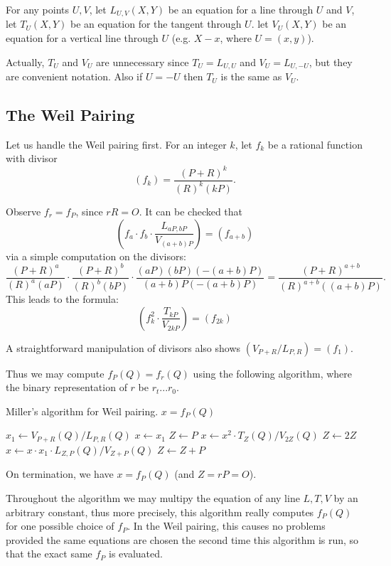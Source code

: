 For any points $U, V$,
let $L_{U,V}(X,Y)$ be an equation for a line through $U$ and $V$,
let $T_{U}(X,Y)$ be an equation for the tangent through $U$.
let
$V_{U}(X,Y)$ be an equation for a vertical line through $U$ (e.g.
$X - x$, where $U = (x, y)$).

Actually, $T_U$ and $V_U$ are unnecessary since
$T_U = L_{U,U}$ and $V_U = L_{U,-U}$, but they are convenient notation.
Also if $U = -U$ then $T_U$ is the same as $V_U$.

\subsection {The Weil Pairing}

Let us handle the Weil pairing first. For an integer $k$, let
$f_k$ be a rational function with divisor
\[
(f_k) = \frac{(P+R)^k}{(R)^k(kP)} .
\]

Observe $f_r = f_P$, since $rR = O$.
It can be checked that
\[
\left(
f_a \cdot f_b \cdot \frac{L_{aP,bP}}{V_{(a+b)P}}
\right) = (f_{a+b})
\]
via a simple computation on the divisors:
\[
\frac{(P+R)^a}{(R)^a(aP)}
\cdot
\frac{(P+R)^b}{(R)^b(bP)}
\cdot
\frac{(aP)(bP)(-(a+b)P)}{(a+b)P(-(a+b)P)}
=
\frac{(P+R)^{a+b}}{(R)^{a+b}((a+b)P)} .
\]
This leads to the formula:
\[
\left(
f_k^2 \cdot \frac{T_{kP}}{V_{2kP}}
\right) = (f_{2k})
\]

A straightforward manipulation of divisors also shows
$( V_{P+R} / L_{P,R}) = (f_1)$.

Thus we may compute $f_P(Q) = f_r(Q)$ using the following algorithm,
where the binary representation of $r$ be $r_t ... r_0$.

\begin{algorithm}
\caption{Miller's algorithm for Weil pairing. $x = f_P(Q)$}
\begin{algorithmic}[1]
\STATE $x_1 \gets V_{P+R}(Q) / L_{P,R}(Q)$
\STATE $x \gets x_1$
\STATE $Z \gets P$
    \STATE $x \gets x^2 \cdot T_Z(Q) / V_{2Z}(Q)$
    \STATE $Z \gets 2Z$
	\STATE $x \gets x \cdot x_1 \cdot L_{Z, P}(Q) / V_{Z+P}(Q)$
	\STATE $Z \gets Z + P$
    \ENDIF
\ENDFOR
\end{algorithmic}
\end{algorithm}

On termination, we have $x = f_P(Q)$ (and $Z = rP = O$).

Throughout the algorithm we may multipy the equation of any line $L, T, V$
by an arbitrary constant, thus more precisely, this algorithm
really computes $f_P(Q)$ for one possible choice of $f_P$.
In the Weil pairing,
this causes no problems provided the same equations are chosen the second
time this algorithm is run, so that the exact same $f_P$ is evaluated.

